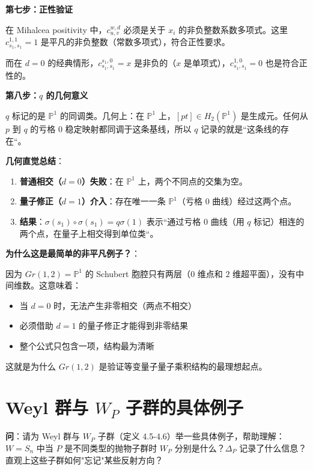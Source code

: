\textbf{第七步：正性验证}

在 Mihalcea positivity 中，$c_{u,v}^{w,d}$ 必须是关于 $x_i$ 的非负整数系数多项式。这里 $c_{s_1,s_1}^{1,1} = 1$ 是平凡的非负整数（常数多项式），符合正性要求。

而在 $d = 0$ 的经典情形，$c_{s_1,s_1}^{s_1,0} = x$ 是非负的（$x$ 是单项式），$c_{s_1,s_1}^{1,0} = 0$ 也是符合正性的。

\textbf{第八步：$q$ 的几何意义}

$q$ 标记的是 $\mathbb{P}^1$ 的同调类。几何上：在 $\mathbb{P}^1$ 上，$[pt] \in H_2(\mathbb{P}^1)$ 是生成元。任何从 $p$ 到 $q$ 的亏格 0 稳定映射都同调于这条基线，所以 $q$ 记录的就是``这条线的存在``。

\textbf{几何直觉总结}：

\begin{enumerate}
\item \textbf{普通相交（$d=0$）失败}：在 $\mathbb{P}^1$ 上，两个不同点的交集为空。
\item \textbf{量子修正（$d=1$）介入}：存在唯一一条 $\mathbb{P}^1$（亏格 0 曲线）经过这两个点。
\item \textbf{结果}：$\sigma(s_1) \circ \sigma(s_1) = q \sigma(1)$ 表示``通过亏格 0 曲线（用 $q$ 标记）相连的两个点，在量子上相交得到单位类``。
\end{enumerate}

\textbf{为什么这是最简单的非平凡例子？}：

因为 $Gr(1,2) = \mathbb{P}^1$ 的 Schubert 胞腔只有两层（$0$ 维点和 $2$ 维超平面），没有中间维数。这意味着：
\begin{itemize}
\item 当 $d = 0$ 时，无法产生非零相交（两点不相交）
\item 必须借助 $d = 1$ 的量子修正才能得到非零结果
\item 整个公式只包含一项，结构最为清晰
\end{itemize}

这就是为什么 $Gr(1,2)$ 是验证等变量子量子乘积结构的最理想起点。


\section{Weyl 群与 $W_P$ 子群的具体例子}\label{sec:qa-WeylGroupAndWP}

\textbf{问}：请为 Weyl 群与 $W_P$ 子群（定义 4.5-4.6）举一些具体例子，帮助理解：$W = S_n$ 中当 $P$ 是不同类型的抛物子群时 $W_P$ 分别是什么？$\Delta_P$ 记录了什么信息？直观上这些子群如何"忘记"某些反射方向？

